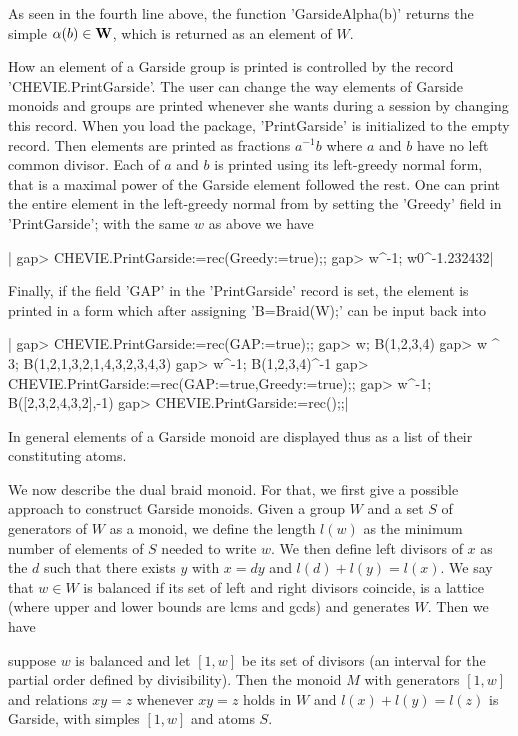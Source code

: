 As  seen in the  fourth line above,  the function 'GarsideAlpha(b)' returns
the simple $\alpha(b)\in{\bf W}$, which is returned as an element of $W$.

How  an element of a  Garside group is printed  is controlled by the record
'CHEVIE.PrintGarside'.  The  user  can  change  the way elements of Garside
monoids  and groups are printed whenever  she wants during a {\GAP} session
by   changing   this   record.   When   you  load  the  {\CHEVIE}  package,
'PrintGarside'  is  initialized  to  the  empty  record.  Then elements are
printed  as  fractions  $a^{-1}b$  where  $a$  and  $b$ have no left common
divisor.  Each of $a$ and $b$ is printed using its left-greedy normal form,
that  is a maximal power of the  Garside element followed the rest. One can
print  the entire  element in  the left-greedy  normal from  by setting the
'Greedy' field in 'PrintGarside'; with the same $w$ as above we have\:

|    gap> CHEVIE.PrintGarside:=rec(Greedy:=true);;
    gap> w^-1;
    w0^-1.232432|

Finally,  if  the  field  'GAP'  in  the  'PrintGarside' record is set, the
element  is printed in a form  which after assigning 'B\:=Braid(W);' can be
input back into {\GAP}\:

|    gap> CHEVIE.PrintGarside:=rec(GAP:=true);;
    gap> w;
    B(1,2,3,4)
    gap> w ^ 3;
    B(1,2,1,3,2,1,4,3,2,3,4,3)
    gap> w^-1;
    B(1,2,3,4)^-1
    gap> CHEVIE.PrintGarside:=rec(GAP:=true,Greedy:=true);;
    gap> w^-1;
    B([2,3,2,4,3,2],-1)
    gap> CHEVIE.PrintGarside:=rec();;|

In  general elements of  a Garside monoid  are displayed thus  as a list of
their constituting atoms.

We  now describe the dual braid monoid.  For that, we first give a possible
approach  to construct Garside monoids. Given a  group $W$ and a set $S$ of
generators  of $W$ as a monoid, we  define the length $l(w)$ as the minimum
number of elements of $S$ needed to write $w$. We then define left divisors
of   $x$  as  the  $d$   such  that  there  exists   $y$  with  $x=dy$  and
$l(d)+l(y)=l(x)$.  We say that $w\in W$ is  balanced if its set of left and
right  divisors coincide,  is a  lattice (where  upper and lower bounds are
lcms and gcds) and generates $W$. Then we have\:

suppose $w$ is balanced and let $[1,w]$ be its set of divisors (an interval
for  the partial order  defined by divisibility).  Then the monoid $M$ with
generators  $[1,w]$ and relations  $xy=z$ whenever $xy=z$  holds in $W$ and
$l(x)+l(y)=l(z)$ is Garside, with simples $[1,w]$ and atoms $S$.

